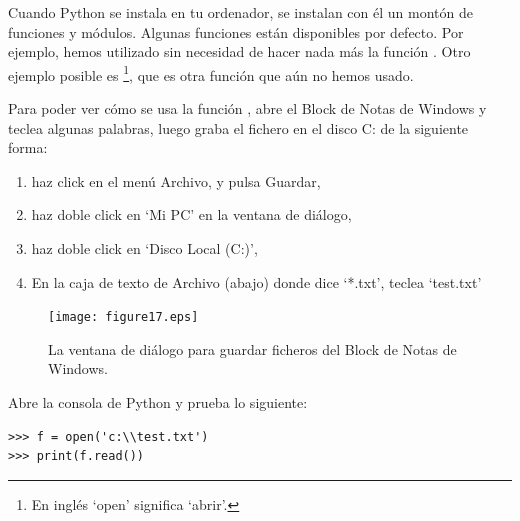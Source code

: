 Cuando Python se instala en tu ordenador, se instalan con él un montón de funciones y módulos. Algunas funciones están disponibles por defecto.  Por ejemplo, hemos utilizado sin necesidad de hacer nada más la función .  Otro ejemplo posible es \footnote{En inglés `open' significa `abrir'.}, que es otra función que aún no hemos usado.

\begin{WINDOWS}

Para poder ver cómo se usa la función , abre el Block de Notas de Windows y teclea algunas palabras, luego graba el fichero en el disco C: de la siguiente forma:

\begin{enumerate}
 \item haz click en el menú Archivo, y pulsa Guardar,
 \item haz doble click en `Mi PC' en la ventana de diálogo,
 \item haz doble click en `Disco Local (C:)',
 \item En la caja de texto de Archivo (abajo) donde dice `*.txt', teclea `test.txt' 
\end{enumerate}

\begin{figure}
\begin{center}
\texttt{[image: figure17.eps]}
\end{center}
\caption{La ventana de diálogo para guardar ficheros del Block de Notas de Windows.}\label{fig17}
\end{figure}

Abre la consola de Python y prueba lo siguiente:

\begin{listing}
\begin{verbatim}
>>> f = open('c:\\test.txt')
>>> print(f.read())
\end{verbatim}
\end{listing}

\end{WINDOWS}

